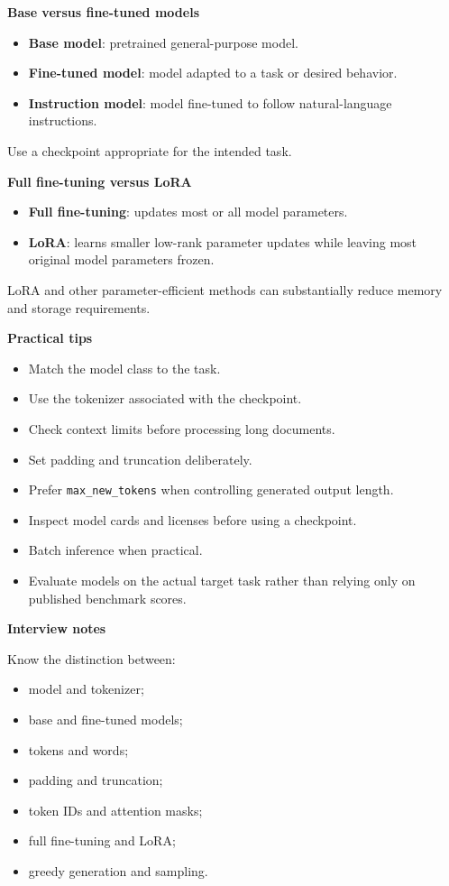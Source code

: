 \documentclass[11pt,letterpaper]{article}
\begin{document}
\textbf{Base versus fine-tuned models}

\begin{itemize}[leftmargin=*]
    \item \textbf{Base model}: pretrained general-purpose model.
    \item \textbf{Fine-tuned model}: model adapted to a task or desired behavior.
    \item \textbf{Instruction model}: model fine-tuned to follow natural-language
    instructions.
\end{itemize}

Use a checkpoint appropriate for the intended task.

\textbf{Full fine-tuning versus LoRA}

\begin{itemize}[leftmargin=*]
    \item \textbf{Full fine-tuning}: updates most or all model parameters.
    \item \textbf{LoRA}: learns smaller low-rank parameter updates while leaving most
    original model parameters frozen.
\end{itemize}

LoRA and other parameter-efficient methods can substantially reduce memory and
storage requirements.

\textbf{Practical tips}

\begin{itemize}[leftmargin=*]
    \item Match the model class to the task.
    \item Use the tokenizer associated with the checkpoint.
    \item Check context limits before processing long documents.
    \item Set padding and truncation deliberately.
    \item Prefer \texttt{max\_new\_tokens} when controlling generated output length.
    \item Inspect model cards and licenses before using a checkpoint.
    \item Batch inference when practical.
    \item Evaluate models on the actual target task rather than relying only on
    published benchmark scores.
\end{itemize}

\textbf{Interview notes}

Know the distinction between:

\begin{itemize}[leftmargin=*]
    \item model and tokenizer;
    \item base and fine-tuned models;
    \item tokens and words;
    \item padding and truncation;
    \item token IDs and attention masks;
    \item full fine-tuning and LoRA;
    \item greedy generation and sampling.
\end{itemize}
\end{document}
